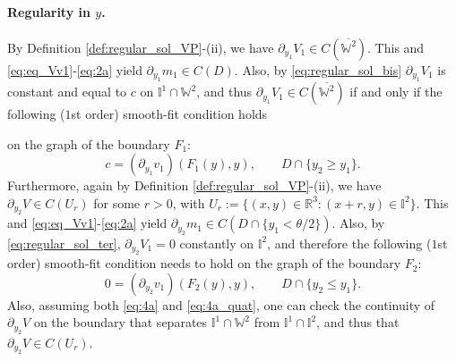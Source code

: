 \documentclass[10pt]{article}
\numberwithin{equation}{section}
\theoremstyle{plain}
\numberwithin{theorem}{section}
\theoremstyle{definition}
\def \R {\mathbb{R}}
\def \p {\partial}
\newcommand{\<}{\langle}
\renewcommand{\>}{\rangle}
\renewcommand{\(}{\left(}
\renewcommand{\)}{\right)}
\def \R  {{\mathbb {R}}}
\def \p {{\partial}}
\def \R {{\mathbb {R}}}
\begin{document}
{{{\paragraph{Regularity in $y$.} By Definition \ref{def:regular_sol_VP}-(ii), we have $\p_{y_1}V_1 \in C (\overline{\mathbb{W}^2})$. This and \eqref{eq:eq_Vv1}-\eqref{eq:2a} yield $\partial_{y_1} m_1\in C(D)$. Also, by \eqref{eq:regular_sol_bis} $\p_{y_1}V_1$ is 
constant and equal to $c$ on $\mathbb{I}^1\cap \mathbb{W}^2$, and thus $\p_{y_1}V_1 \in C (\overline{\mathbb{W}^2})$ if and only if the following ($1$st order) smooth-fit condition holds} on the graph of the boundary $F_1$:
\begin{equation}\label{eq:4a}
c=\left(\p_{y_1}v_1\right)(F_1(y),y) , \qquad D\cap \{y_2\geq y_1\}.
\end{equation}
Furthermore, again by Definition \ref{def:regular_sol_VP}-(ii), we have $\p_{y_2} V\in C(U_r)$ for some $r>0$, with $U_r := \{(x,y) \in \R^3 : (x+r,y)\in \mathbb{I}^2\}$. This and \eqref{eq:eq_Vv1}-\eqref{eq:2a} yield $\partial_{y_2} m_1\in C(D\cap\{y_1<\theta/2\})$. Also, by \eqref{eq:regular_sol_ter}, $\p_{y_2}V_1 =0$ %
constantly on $\mathbb{I}^2$, and therefore the following ($1$st order) smooth-fit condition needs to hold on the graph of the boundary $F_2$:
\begin{equation}\label{eq:4a_quat}
0=\left(\p_{y_2}v_1\right)(F_2(y),y), \qquad D\cap \{y_2\leq y_1\}.
\end{equation}
Also, assuming both \eqref{eq:4a} and \eqref{eq:4a_quat}, one can check the continuity of $\p_{y_2} V$ on the boundary that separates $\mathbb{I}^1\cap \mathbb{W}^2$ from $\mathbb{I}^1\cap \mathbb{I}^2$, %
and thus that $\p_{y_2} V\in C(U_r)$.
}}
\end{document}
